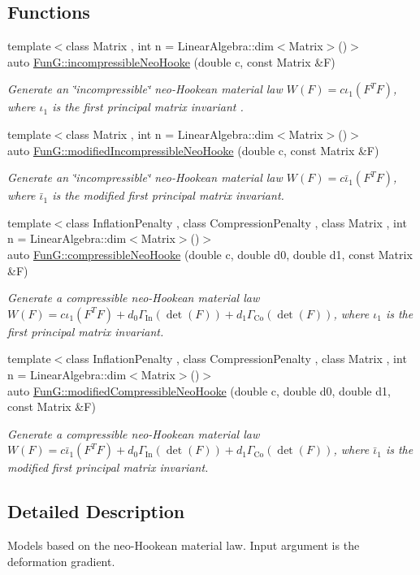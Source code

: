\subsection*{Functions}
\begin{DoxyCompactItemize}
\item 
{\footnotesize template$<$class Matrix , int n = Linear\+Algebra\+::dim$<$\+Matrix$>$()$>$ }\\auto \hyperlink{group__Rubber_ga5bb28aef7006413775791998936d6b81}{Fun\+G\+::incompressible\+Neo\+Hooke} (double c, const Matrix \&F)
\begin{DoxyCompactList}\small\item\em Generate an \char`\"{}incompressible\char`\"{} neo-\/\+Hookean material law $ W(F)=c\iota_1(F^T F) $, where $\iota_1$ is the first principal matrix invariant . \end{DoxyCompactList}\item 
{\footnotesize template$<$class Matrix , int n = Linear\+Algebra\+::dim$<$\+Matrix$>$()$>$ }\\auto \hyperlink{group__Rubber_gaf6f5ab6a379ef03d513acc5042731a01}{Fun\+G\+::modified\+Incompressible\+Neo\+Hooke} (double c, const Matrix \&F)
\begin{DoxyCompactList}\small\item\em Generate an \char`\"{}incompressible\char`\"{} neo-\/\+Hookean material law $ W(F)=c\bar\iota_1(F^T F) $, where $\bar\iota_1$ is the modified first principal matrix invariant. \end{DoxyCompactList}\item 
{\footnotesize template$<$class Inflation\+Penalty , class Compression\+Penalty , class Matrix , int n = Linear\+Algebra\+::dim$<$\+Matrix$>$()$>$ }\\auto \hyperlink{group__Rubber_gac5c39cd9de55f4f0220a806cf28a7b30}{Fun\+G\+::compressible\+Neo\+Hooke} (double c, double d0, double d1, const Matrix \&F)
\begin{DoxyCompactList}\small\item\em Generate a compressible neo-\/\+Hookean material law $ W(F)=c\iota_1(F^T F)+d_0\Gamma_\mathrm{In}(\det(F))+d_1\Gamma_\mathrm{Co}(\det(F)) $, where $\iota_1$ is the first principal matrix invariant. \end{DoxyCompactList}\item 
{\footnotesize template$<$class Inflation\+Penalty , class Compression\+Penalty , class Matrix , int n = Linear\+Algebra\+::dim$<$\+Matrix$>$()$>$ }\\auto \hyperlink{group__Rubber_gac10942df03f037afdf0a81d330361a6b}{Fun\+G\+::modified\+Compressible\+Neo\+Hooke} (double c, double d0, double d1, const Matrix \&F)
\begin{DoxyCompactList}\small\item\em Generate a compressible neo-\/\+Hookean material law $ W(F)=c\bar\iota_1(F^T F)+d_0\Gamma_\mathrm{In}(\det(F))+d_1\Gamma_\mathrm{Co}(\det(F)) $, where $\bar\iota_1$ is the modified first principal matrix invariant. \end{DoxyCompactList}\end{DoxyCompactItemize}


\subsection{Detailed Description}
Models based on the neo-\/\+Hookean material law. Input argument is the deformation gradient. 

